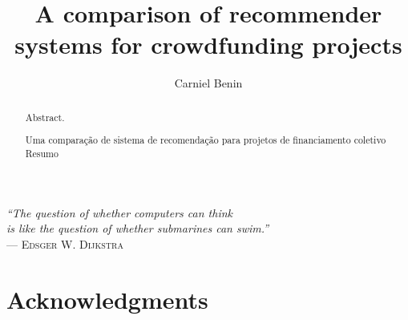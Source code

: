 \documentclass[cic,tc,english]{iiufrgs}
\title{A comparison of recommender systems for crowdfunding projects}
\author{Carniel Benin}{Adriano}
\begin{document}
\maketitle

\clearpage
\begin{flushright}
    \mbox{}\vfill
    {\sffamily\itshape
      ``The question of whether computers can think\\
      is like the question of whether submarines can swim.''\\}
    --- \textsc{Edsger W. Dijkstra}
\end{flushright}

\chapter*{Acknowledgments}
\begin{abstract}
    Abstract.
\end{abstract}
\begin{abstract}{Uma comparação de sistema de recomendação para projetos de financiamento coletivo}
   Resumo
\end{abstract}




\end{document}
